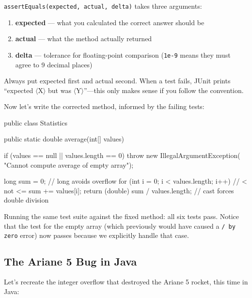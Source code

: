 \documentclass[11pt,letterpaper]{article}
\begin{document}
\begin{tipbox}
\texttt{assertEquals(expected, actual, delta)} takes three arguments:
\begin{enumerate}[itemsep=1pt]
    \item \textbf{expected} --- what you calculated the correct answer should be
    \item \textbf{actual} --- what the method actually returned
    \item \textbf{delta} --- tolerance for floating-point comparison (\texttt{1e-9} means they must agree to 9 decimal places)
\end{enumerate}
Always put expected first and actual second. When a test fails, JUnit prints ``expected $\langle$X$\rangle$ but was $\langle$Y$\rangle$''---this only makes sense if you follow the convention.
\end{tipbox}

Now let's write the corrected method, informed by the failing tests:

\begin{javacode}
public class Statistics {

    public static double average(int[] values) {
        if (values == null || values.length == 0) {
            throw new IllegalArgumentException(
                "Cannot compute average of empty array");
        }

        long sum = 0;                               // long avoids overflow
        for (int i = 0; i < values.length; i++) {  // < not <=
            sum += values[i];
        }
        return (double) sum / values.length;        // cast forces double division
    }
}
\end{javacode}

Running the same test suite against the fixed method: all six tests pass. Notice that the test for the empty array (which previously would have caused a \texttt{/ by zero} error) now passes because we explicitly handle that case.

\subsection{The Ariane 5 Bug in Java}

Let's recreate the integer overflow that destroyed the Ariane 5 rocket, this time in Java:
\end{document}
